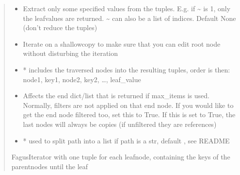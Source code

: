 \documentclass[a4paper,10pt,english]{sphinxmanual}
\begin{document}
\begin{fulllineitems}
\begin{fulllineitems}
\begin{quote}
\begin{description}
\begin{itemize}
\item {}
\sphinxAtStartPar
{} \textendash{} Extract only some specified values from the tuples. E.g. if \textasciitilde{} is \sphinxhyphen{}1, only the leaf\sphinxhyphen{}values are
returned. \textasciitilde{} can also be a list of indices. Default None (don’t reduce the tuples)

\item {}
\sphinxAtStartPar
{} \textendash{} Iterate on a shallow\sphinxhyphen{}copy to make sure that you can edit root node without disturbing the iteration

\item {}
\sphinxAtStartPar
{} \textendash{} * includes the traversed nodes into the resulting tuples, order is then:
node1, key1, node2, key2, …, leaf\_value

\item {}
\sphinxAtStartPar
{} \textendash{} Affects the end dict/list that is returned if max\_items is used. Normally, filters are not
applied on that end node. If you would like to get the end node filtered too, set this to True. If this
is set to True, the last nodes will always be copies (if unfiltered they are references)

\item {}
\sphinxAtStartPar
{} \textendash{} * used to split path into a list if path is a str, default , see README

\end{itemize}

\sphinxAtStartPar
FagusIterator with one tuple for each leaf\sphinxhyphen{}node, containing the keys of the parent\sphinxhyphen{}nodes until the leaf

\end{description}\end{quote}

\end{fulllineitems}



\end{fulllineitems}
\end{document}
